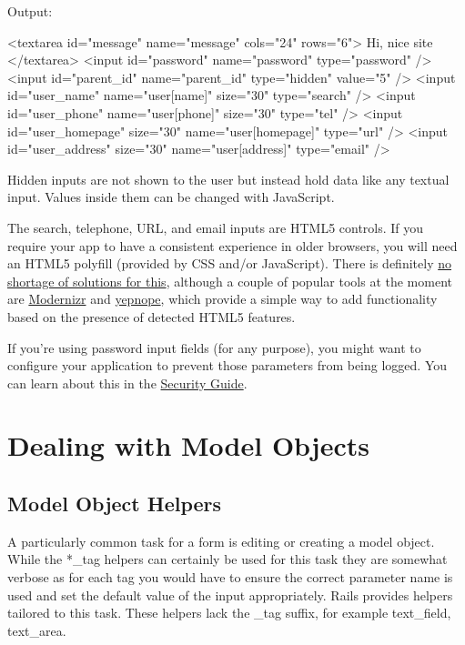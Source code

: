 \documentclass[10pt]{book}
\newenvironment{code}{%
  \scriptsize
    \verbatim
}{%
    \endverbatim
    \newline
}
\begin{document}
Output:
\begin{code}
<textarea id="message" name="message" cols="24" rows="6">
  Hi, nice site
</textarea>
<input id="password" name="password" type="password" />
<input id="parent_id" name="parent_id" type="hidden" value="5" />
<input id="user_name" name="user[name]" size="30" type="search" />
<input id="user_phone" name="user[phone]" size="30" type="tel" />
<input id="user_homepage" size="30" name="user[homepage]" type="url" />
<input id="user_address" size="30" name="user[address]" type="email" />
\end{code}

Hidden inputs are not shown to the user but instead hold data like  any textual input. Values inside them can be changed with JavaScript.

The search, telephone, URL,  and email inputs are HTML5 controls. If you require your app to have a  consistent experience in older browsers, you will need an HTML5 polyfill  (provided by CSS and/or JavaScript). There is definitely \href{https://github.com/Modernizr/Modernizr/wiki/HTML5-Cross-Browser-Polyfills}{no shortage of solutions for this}, although a couple of popular tools at the moment are \href{http://www.modernizr.com/}{Modernizr} and \href{http://yepnopejs.com/}{yepnope}, which provide a simple way to add functionality based on the presence of detected HTML5 features.

If you’re using password input fields (for any  purpose), you might want to configure your application to prevent those  parameters from being logged. You can learn about this in the \href{http://guides.rubyonrails.org/security.html#logging}{Security Guide}.

\section{ Dealing with Model Objects}

\subsection{ Model Object Helpers}

A particularly common task for a form is editing or creating a model object. While the *\_tag  helpers can certainly be used for this task they are somewhat verbose  as for each tag you would have to ensure the correct parameter name is  used and set the default value of the input appropriately. Rails  provides helpers tailored to this task. These helpers lack the \_tag  suffix, for example text\_field, text\_area.
\end{document}
